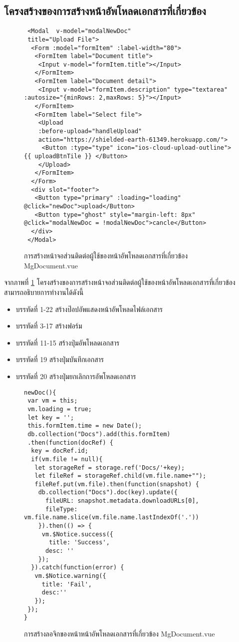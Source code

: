 		\subsection{โครงสร้างของการสร้างหน้าอัพโหลดเอกสารที่เกี่ยวข้อง}
		\begin{figure}[H]
			{\begin{lstlisting}
 <Modal  v-model="modalNewDoc"
 title="Upload File">
  <Form :model="formItem" :label-width="80">
   <FormItem label="Document title">
    <Input v-model="formItem.title"></Input>
   </FormItem>
   <FormItem label="Document detail">
    <Input v-model="formItem.description" type="textarea" :autosize="{minRows: 2,maxRows: 5}"></Input>
   </FormItem>
   <FormItem label="Select file">
    <Upload
    :before-upload="handleUpload"
    action="https://shielded-earth-61349.herokuapp.com/">
     <Button :type="type" icon="ios-cloud-upload-outline"> {{ uploadBtnTile }} </Button>
    </Upload>
   </FormItem>
  </Form>
  <div slot="footer">
   <Button type="primary" :loading="loading" @click="newDoc">upload</Button>
   <Button type="ghost" style="margin-left: 8px" @click="modalNewDoc = !modalNewDoc">cancle</Button>
  </div>
 </Modal>
				\end{lstlisting}}
			\caption{การสร้างหน้าจอส่วนติดต่อผู้ใช้ของหน้าอัพโหลดเอกสารที่เกี่ยวข้อง MgDocument.vue} %
			\label{Fig:MgDocument}
		\end{figure}
		จากภาพที่ \ref{Fig:MgDocument} โครงสร้างของการสร้างหน้าจอส่วนติดต่อผู้ใช้ของหน้าอัพโหลดเอกสารที่เกี่ยวข้อง สามารถอธิบายการทำงานได้ดังนี้
		\begin{itemize}[label={--}]
			\item บรรทัดที่ 1-22 สร้างป๊อปอัพแสดงหน้าอัพโหลดไฟล์เอกสาร
			\item บรรทัดที่ 3-17 สร้างฟอร์ม
			\item บรรทัดที่ 11-15 สร้างปุ่มอัพโหลดเอกสาร
			\item บรรทัดที่ 19 สร้างปุ่มบันทึกเอกสาร
			\item บรรทัดที่ 20 สร้างปุ่มยกเลิกการอัพโหลดเอกสาร  
		\end{itemize}
		\begin{figure}[H]
			{\begin{lstlisting}
newDoc(){
 var vm = this;
 vm.loading = true;
 let key = '';
 this.formItem.time = new Date();
 db.collection("Docs").add(this.formItem)
 .then(function(docRef) {
  key = docRef.id;
  if(vm.file != null){
   let storageRef = storage.ref('Docs/'+key);
   let fileRef = storageRef.child(vm.file.name+"");
   fileRef.put(vm.file).then(function(snapshot) {
    db.collection("Docs").doc(key).update({
      fileURL: snapshot.metadata.downloadURLs[0],
      fileType: vm.file.name.slice(vm.file.name.lastIndexOf('.'))
    }).then(() => {
     vm.$Notice.success({
       title: 'Success',
      desc: ''
    });
  }).catch(function(error) {
   vm.$Notice.warning({
     title: 'Fail',
     desc:''
   });
 });
}

				\end{lstlisting}}
			\caption{การสร้างลอจิกของหน้าหน้าอัพโหลดเอกสารที่เกี่ยวข้อง MgDocument.vue}
			\label{Fig:MgDocumentJs}
		\end{figure}
